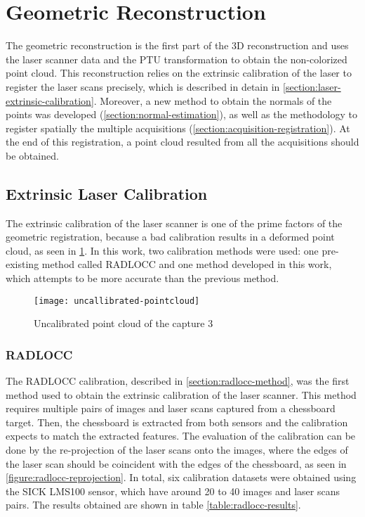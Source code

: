 \section{Geometric Reconstruction}

The geometric reconstruction is the first part of the 3D reconstruction and uses the laser scanner data and the PTU transformation to obtain the non-colorized point cloud. This reconstruction relies on the extrinsic calibration of the laser to register the laser scans precisely, which is described in detain in \cref{section:laser-extrinsic-calibration}. Moreover, a new method to obtain the normals of the points was developed (\cref{section:normal-estimation}), as well as the methodology to register spatially the multiple acquisitions (\cref{section:acquisition-registration}). At the end of this registration, a point cloud resulted from all the acquisitions should be obtained.

\subsection{Extrinsic Laser Calibration}

The extrinsic calibration of the laser scanner is one of the prime factors of the geometric registration, because a bad calibration results in a deformed point cloud, as seen in \cref{figure:uncallibrated-pointcloud}. In this work, two calibration methods were used: one pre-existing method called RADLOCC and one method developed in this work, which attempts to be more accurate than the previous method. 

\begin{figure}[h]
    
    \centering
    \texttt{[image: uncallibrated-pointcloud]}

    \caption{Uncalibrated point cloud of the capture 3}
    \label{figure:uncallibrated-pointcloud}

\end{figure}

\subsubsection{RADLOCC}

The RADLOCC calibration, described in \cref{section:radlocc-method}, was the first method used to obtain the extrinsic calibration of the laser scanner. This method requires multiple pairs of images and laser scans captured from a chessboard target. Then, the chessboard is extracted from both sensors and the calibration expects to match the extracted features. The evaluation of the calibration can be done by the re-projection of the laser scans onto the images, where the edges of the laser scan should be coincident with the edges of the chessboard, as seen in \cref{figure:radlocc-reprojection}. In total, six calibration datasets were obtained using the SICK LMS100 sensor, which have around 20 to 40 images and laser scans pairs. The results obtained are shown in table \cref{table:radlocc-results}.


